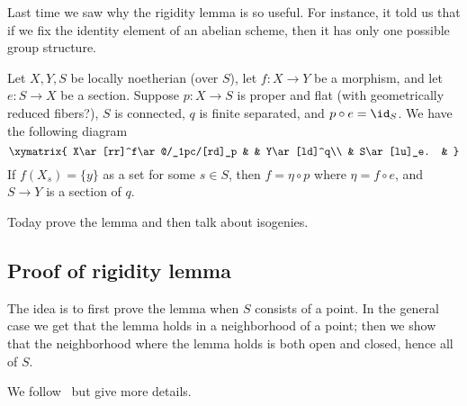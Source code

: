 
Last time we saw why the rigidity lemma is so useful. For instance, it told us that if we fix the identity element of an abelian scheme, then it has only one possible group structure. 

\begin{pr}
Let $X,Y,S$ be locally noetherian (over $S$), let $f:X\to Y$ be a morphism, and let $e:S\to X$ be a section. Suppose $p:X\to S$ is proper and flat (with geometrically reduced fibers?), $S$ is connected, $q$ is finite separated, and $p\circ e=\id_S$. We have the following diagram
\[
\xymatrix{
X\ar[rr]^f\ar@/_1pc/[rd]_p & & Y\ar[ld]^q\\
& S\ar[lu]_e. & 
}
\]
If $f(X_s)=\{y\}$ as a set for some $s\in S$, then $f=\eta \circ p$ where $\eta=f\circ e$, and $S\to Y$ is a section of $q$.
\end{pr}

Today prove the lemma and then talk about isogenies.

\subsection{Proof of rigidity lemma}
The idea is to first prove the lemma when $S$ consists of a point. In the general case we get that the lemma holds in a neighborhood of a point; then we show that the neighborhood where the lemma holds is both open and closed, hence all of $S$.

We follow~\cite[p. 115]{GIT} but give more details.

